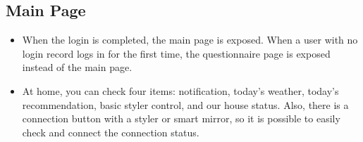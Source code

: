\documentclass[conference]{IEEEtran}
\begin{document}
\subsection{Main Page}
\begin{itemize}
    \item[] When the login is completed, the main page is exposed. When a user with no login record logs in for the first time, the questionnaire page is exposed instead of the main page.
    \item[] At home, you can check four items: notification, today's weather, today's recommendation, basic styler control, and our house status. Also, there is a connection button with a styler or smart mirror, so it is possible to easily check and connect the connection status.\\  
\end{itemize}
\end{document}
